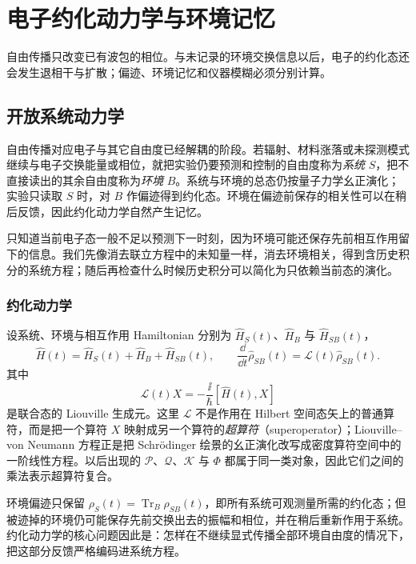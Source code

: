 \chapter{电子约化动力学与环境记忆}\label{chap:electron-open-dynamics}

自由传播只改变已有波包的相位。与未记录的环境交换信息以后，电子的约化态还会发生退相干与扩散；偏迹、环境记忆和仪器模糊必须分别计算。

\section{开放系统动力学}

自由传播对应电子与其它自由度已经解耦的阶段。若辐射、材料涨落或未探测模式继续与电子交换能量或相位，就把实验仍要预测和控制的自由度称为\emph{系统} $S$，把不直接读出的其余自由度称为\emph{环境} $B$。系统与环境的总态仍按量子力学幺正演化；实验只读取 $S$ 时，对 $B$ 作偏迹得到约化态。环境在偏迹前保存的相关性可以在稍后反馈，因此约化动力学自然产生记忆。

只知道当前电子态一般不足以预测下一时刻，因为环境可能还保存先前相互作用留下的信息。我们先像消去联立方程中的未知量一样，消去环境相关，得到含历史积分的系统方程；随后再检查什么时候历史积分可以简化为只依赖当前态的演化。

\subsection{约化动力学}

设系统、环境与相互作用 Hamiltonian 分别为 $\hat H_S(t)$、$\hat H_B$ 与 $\hat H_{SB}(t)$，
\begin{equation}
\boxed{
\hat H(t)=\hat H_S(t)+\hat H_B+\hat H_{SB}(t),
\qquad
\frac{\dd}{\dd t}\hat\rho_{SB}(t)=\mathcal L(t)\hat\rho_{SB}(t).}
\label{eq:open_system_joint_liouville_equation}
\end{equation}
其中
\[
\mathcal L(t)X=-\frac{\ii}{\hbar}[\hat H(t),X]
\]
是联合态的 Liouville 生成元。这里 $\mathcal L$ 不是作用在 Hilbert 空间态矢上的普通算符，而是把一个算符 $X$ 映射成另一个算符的\emph{超算符}（superoperator）；Liouville--von Neumann 方程正是把 Schr\"odinger 绘景的幺正演化改写成密度算符空间中的一阶线性方程。以后出现的 $\mathcal P$、$\mathcal Q$、$\mathcal K$ 与 $\Phi$ 都属于同一类对象，因此它们之间的乘法表示超算符复合。

环境偏迹只保留
$\rho_S(t)=\operatorname{Tr}_B\rho_{SB}(t)$，即所有系统可观测量所需的约化态；但被迹掉的环境仍可能保存先前交换出去的振幅和相位，并在稍后重新作用于系统。约化动力学的核心问题因此是：怎样在不继续显式传播全部环境自由度的情况下，把这部分反馈严格编码进系统方程。

